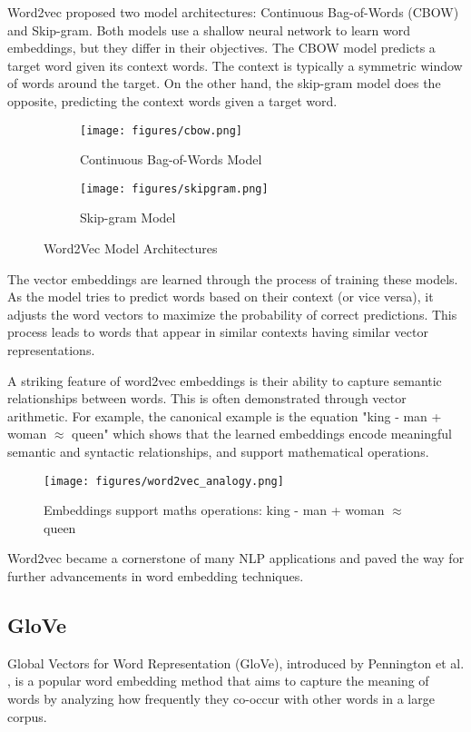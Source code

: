 \documentclass[a4paper, oneside]{discothesis}
\begin{document}
Word2vec proposed two model architectures: Continuous Bag-of-Words (CBOW) and Skip-gram. Both models use a shallow neural network to learn word embeddings, but they differ in their objectives. 
The CBOW model predicts a target word given its context words. The context is typically a symmetric window of words around the target.
On the other hand, the skip-gram model does the opposite, predicting the context words given a target word.
\begin{figure}[h]
    \centering
    \begin{subfigure}[b]{0.45\textwidth}
        \centering
        \texttt{[image: figures/cbow.png]}
        \caption{Continuous Bag-of-Words Model}
        \label{fig:cbow}
    \end{subfigure}
    \hfill
    \begin{subfigure}[b]{0.45\textwidth}
        \centering
        \texttt{[image: figures/skipgram.png]}
        \caption{Skip-gram Model}
        \label{fig:skipgram}
    \end{subfigure}
    \caption{Word2Vec Model Architectures}
    \label{fig:word2vec}
\end{figure}

The vector embeddings are learned through the process of training these models. As the model tries to predict words based on their context (or vice versa), it adjusts the word vectors to maximize the probability of correct predictions. This process leads to words that appear in similar contexts having similar vector representations.

A striking feature of word2vec embeddings is their ability to capture semantic relationships between words. This is often demonstrated through vector arithmetic. For example, the canonical example is the equation "king - man + woman $\approx$ queen" which shows that the learned embeddings encode meaningful semantic and syntactic relationships, and support mathematical operations.

\begin{figure}[h]
    \centering
    \texttt{[image: figures/word2vec\_analogy.png]}
    \caption{Embeddings support maths operations: king - man + woman $\approx$ queen}
    \label{fig:word2vec_analogy}
\end{figure}

Word2vec became a cornerstone of many NLP applications and paved the way for further advancements in word embedding techniques.

\subsection{GloVe}
Global Vectors for Word Representation (GloVe), introduced by Pennington et al. \cite{pennington2014glove}, is a popular word embedding method that aims to capture the meaning of words by analyzing how frequently they co-occur with other words in a large corpus.
\end{document}
